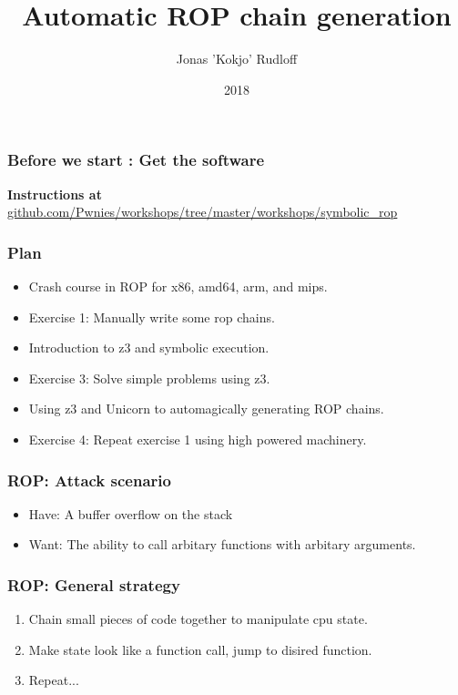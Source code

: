 \documentclass{beamer}
\title{Automatic ROP chain generation}
\author{Jonas 'Kokjo' Rudloff }
\institute{Pwnies @ Copenhagen University}
\date{2018}
\begin{document}
\frame{\titlepage}

\begin{frame}
    \frametitle{Before we start : Get the software}
    \textbf{Instructions at} \\
    {\small \url{github.com/Pwnies/workshops/tree/master/workshops/symbolic\_rop}}
\end{frame}

\begin{frame}
    \frametitle{Plan}
    \begin{itemize}
        \item Crash course in ROP for x86, amd64, arm, and mips.
        \item Exercise 1: Manually write some rop chains.
        \item Introduction to z3 and symbolic execution.
        \item Exercise 3: Solve simple problems using z3.
        \item Using z3 and Unicorn to automagically generating ROP chains.
        \item Exercise 4: Repeat exercise 1 using high powered machinery.
    \end{itemize}
\end{frame}

\begin{frame}
    \frametitle{ROP: Attack scenario}
    \begin{itemize}
        \pause \item Have: A buffer overflow on the stack
        \pause \item Want: The ability to call arbitary functions with arbitary arguments.
    \end{itemize}
\end{frame}


\begin{frame}
    \frametitle{ROP: General strategy}
    \begin{enumerate}
        \pause \item Chain small pieces of code together to manipulate cpu state.
        \pause \item Make state look like a function call, jump to disired function.
        \pause \item Repeat...
    \end{enumerate}
\end{frame}
\end{document}
